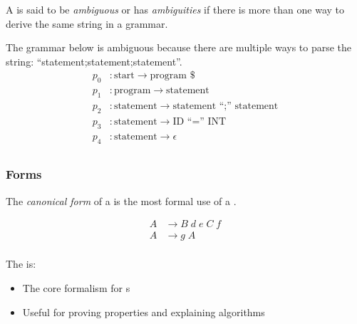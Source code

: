 \begin{definition}[Ambiguous]\label{def:Ambiguous}
  A  is said to be \emph{ambiguous} or has \emph{ambiguities} if there is more than one way to derive the same string in a grammar.

  The grammar below is ambiguous because there are multiple ways to parse the string: ``statement;statement;statement''.
  \begin{equation}\label{eq:Ambiguous}
    \begin{aligned}
      p_{0} &: \text{start} \rightarrow \text{program } \$ \\
      p_{1} &: \text{program} \rightarrow \text{statement} \\
      p_{2} &: \text{statement} \rightarrow \text{statement ``;'' statement} \\
      p_{3} &: \text{statement} \rightarrow \text{ID ``='' INT} \\
      p_{4} &: \text{statement} \rightarrow \epsilon \\
    \end{aligned}
  \end{equation}
\end{definition}

\subsubsection{ Forms}\label{subsubsec:CFG_Forms}
\begin{definition}\label{def:CFG_Canonical_Form}
  The \emph{canonical form} of a  is the most formal use of a .

  \begin{equation}\label{eq:CFG_Canonical_Form}
    \begin{aligned}
      A &\rightarrow B \; d \; e \; C \; f \\
      A &\rightarrow g \; A \\
    \end{aligned}
  \end{equation}

  The  is:
  \begin{itemize}[noitemsep]
  \item The core formalism for s
  \item Useful for proving properties and explaining algorithms
  \end{itemize}
\end{definition}


